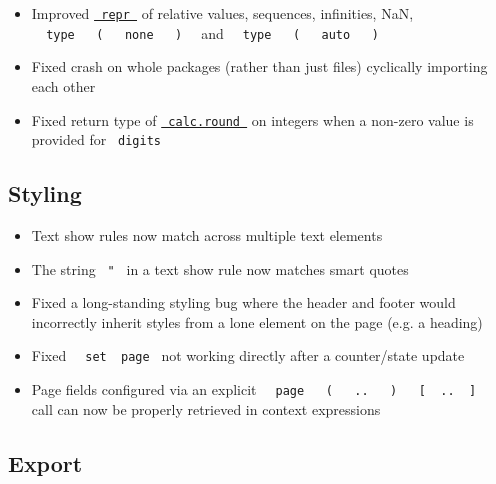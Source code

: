 \begin{itemize}
  .
\item
  Improved \href{/docs/reference/foundations/repr/}{\texttt{\ repr\ }}
  of relative values, sequences, infinities, NaN,
  \texttt{\ }{\texttt{\ type\ }}\texttt{\ }{\texttt{\ (\ }}\texttt{\ }{\texttt{\ none\ }}\texttt{\ }{\texttt{\ )\ }}\texttt{\ }
  and
  \texttt{\ }{\texttt{\ type\ }}\texttt{\ }{\texttt{\ (\ }}\texttt{\ }{\texttt{\ auto\ }}\texttt{\ }{\texttt{\ )\ }}\texttt{\ }
\item
  Fixed crash on whole packages (rather than just files) cyclically
  importing each other
\item
  Fixed return type of
  \href{/docs/reference/foundations/calc/\#functions-round}{\texttt{\ calc.round\ }}
  on integers when a non-zero value is provided for \texttt{\ digits\ }
\end{itemize}

\subsection{Styling}\label{styling}

\begin{itemize}
\tightlist
\item
  Text show rules now match across multiple text elements
\item
  The string \texttt{\ "\ } in a text show rule now matches smart quotes
\item
  Fixed a long-standing styling bug where the header and footer would
  incorrectly inherit styles from a lone element on the page (e.g. a
  heading)
\item
  Fixed \texttt{\ }{\texttt{\ set\ }}\texttt{\ page\ } not working
  directly after a counter/state update
\item
  Page fields configured via an explicit
  \texttt{\ }{\texttt{\ page\ }}\texttt{\ }{\texttt{\ (\ }}\texttt{\ }{\texttt{\ ..\ }}\texttt{\ }{\texttt{\ )\ }}\texttt{\ }{\texttt{\ {[}\ }}\texttt{\ ..\ }{\texttt{\ {]}\ }}\texttt{\ }
  call can now be properly retrieved in context expressions
\end{itemize}

\subsection{Export}\label{export}

